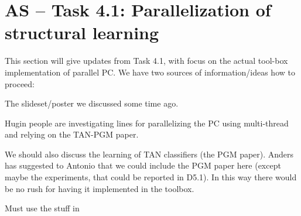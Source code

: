 

\section{AS -- Task 4.1: Parallelization of structural learning}\label{sec:parallel}



This section will give updates from Task 4.1, with focus on the actual tool-box implementation of parallel PC. We have two sources of information/ideas how to proceed: 
\bit
\item The slideset/poster we discussed some time ago.
\item Hugin people are investigating lines for parallelizing the PC using  multi-thread and relying on the TAN-PGM paper.
\eit

We should also discuss the learning of TAN classifiers (the PGM paper). Anders has suggested to Antonio that we could include the PGM paper here (except maybe the experiments, that could be reported in D5.1).
In this way there would be no rush for having it implemented in the toolbox.

Must use the stuff in 